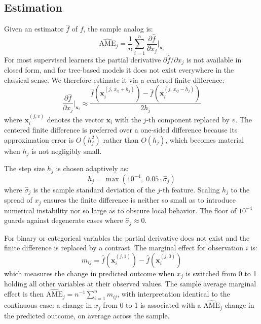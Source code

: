 \documentclass[12pt]{article}
\begin{document}
	\subsection{Estimation}
	
	Given an estimator $\hat{f}$ of $f$, the sample analog is:
	\begin{equation}
		\widehat{\mathrm{AME}}_j = \frac{1}{n} \sum_{i=1}^n \frac{\partial \hat{f}}{\partial x_j}\bigg|_{\mathbf{x}_i}
	\end{equation}
	For most supervised learners the partial derivative $\partial \hat{f} / \partial x_j$ is not available in closed form, and for tree-based models it does not exist everywhere in the classical sense. We therefore estimate it via a centered finite difference:
	\begin{equation}
		\frac{\partial \hat{f}}{\partial x_j}\bigg|_{\mathbf{x}_i} \approx \frac{\hat{f}\!\left(\mathbf{x}_i^{(j,\, x_{ij} + h_j)}\right) - \hat{f}\!\left(\mathbf{x}_i^{(j,\, x_{ij} - h_j)}\right)}{2h_j}
	\end{equation}
	where $\mathbf{x}_i^{(j,v)}$ denotes the vector $\mathbf{x}_i$ with the $j$-th component replaced by $v$. The centered finite difference is preferred over a one-sided difference because its approximation error is $O(h_j^2)$ rather than $O(h_j)$, which becomes material when $h_j$ is not negligibly small.
	
	The step size $h_j$ is chosen adaptively as:
	\begin{equation}
		h_j = \max\!\left(10^{-4},\; 0.05 \cdot \hat{\sigma}_j\right)
	\end{equation}
	where $\hat{\sigma}_j$ is the sample standard deviation of the $j$-th feature. Scaling $h_j$ to the spread of $x_j$ ensures the finite difference is neither so small as to introduce numerical instability nor so large as to obscure local behavior. The floor of $10^{-4}$ guards against degenerate cases where $\hat{\sigma}_j \approx 0$.
	
	For binary or categorical variables the partial derivative does not exist and the finite difference is replaced by a contrast. The marginal effect for observation $i$ is:
	\begin{equation}
		m_{ij} = \hat{f}\!\left(\mathbf{x}_i^{(j,1)}\right) - \hat{f}\!\left(\mathbf{x}_i^{(j,0)}\right)
	\end{equation}
	which measures the change in predicted outcome when $x_j$ is switched from 0 to 1 holding all other variables at their observed values. The sample average marginal effect is then $\widehat{\mathrm{AME}}_j = n^{-1}\sum_{i=1}^n m_{ij}$, with interpretation identical to the continuous case: a change in $x_j$ from 0 to 1 is associated with a $\widehat{\mathrm{AME}}_j$ change in the predicted outcome, on average across the sample.
	
\end{document}
